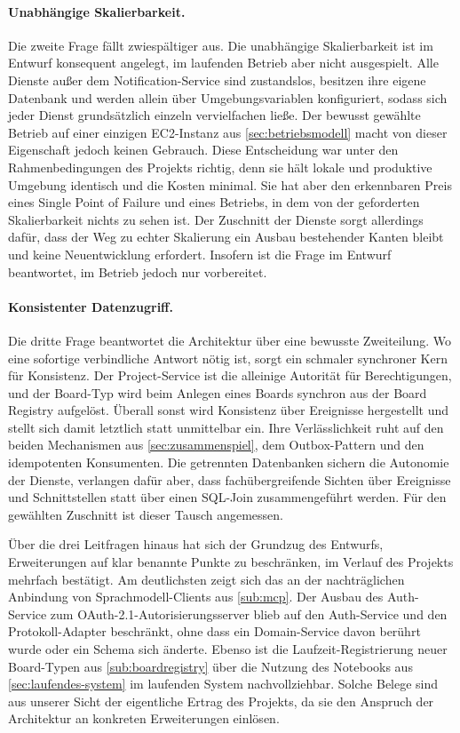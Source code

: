 \paragraph{Unabhängige Skalierbarkeit.} Die zweite Frage fällt zwiespältiger aus. Die unabhängige Skalierbarkeit ist im Entwurf konsequent angelegt, im laufenden Betrieb aber nicht ausgespielt. Alle Dienste außer dem Notification-Service sind zustandslos, besitzen ihre eigene Datenbank und werden allein über Umgebungsvariablen konfiguriert, sodass sich jeder Dienst grundsätzlich einzeln vervielfachen ließe. Der bewusst gewählte Betrieb auf einer einzigen EC2-Instanz aus \vref{sec:betriebsmodell} macht von dieser Eigenschaft jedoch keinen Gebrauch. Diese Entscheidung war unter den Rahmenbedingungen des Projekts richtig, denn sie hält lokale und produktive Umgebung identisch und die Kosten minimal. Sie hat aber den erkennbaren Preis eines Single Point of Failure und eines Betriebs, in dem von der geforderten Skalierbarkeit nichts zu sehen ist. Der Zuschnitt der Dienste sorgt allerdings dafür, dass der Weg zu echter Skalierung ein Ausbau bestehender Kanten bleibt und keine Neuentwicklung erfordert. Insofern ist die Frage im Entwurf beantwortet, im Betrieb jedoch nur vorbereitet.

\paragraph{Konsistenter Datenzugriff.} Die dritte Frage beantwortet die Architektur über eine bewusste Zweiteilung. Wo eine sofortige verbindliche Antwort nötig ist, sorgt ein schmaler synchroner Kern für Konsistenz. Der Project-Service ist die alleinige Autorität für Berechtigungen, und der Board-Typ wird beim Anlegen eines Boards synchron aus der Board Registry aufgelöst. Überall sonst wird Konsistenz über Ereignisse hergestellt und stellt sich damit letztlich statt unmittelbar ein. Ihre Verlässlichkeit ruht auf den beiden Mechanismen aus \vref{sec:zusammenspiel}, dem Outbox-Pattern und den idempotenten Konsumenten. Die getrennten Datenbanken sichern die Autonomie der Dienste, verlangen dafür aber, dass fachübergreifende Sichten über Ereignisse und Schnittstellen statt über einen SQL-Join zusammengeführt werden. Für den gewählten Zuschnitt ist dieser Tausch angemessen.

Über die drei Leitfragen hinaus hat sich der Grundzug des Entwurfs, Erweiterungen auf klar benannte Punkte zu beschränken, im Verlauf des Projekts mehrfach bestätigt. Am deutlichsten zeigt sich das an der nachträglichen Anbindung von Sprachmodell-Clients aus \vref{sub:mcp}. Der Ausbau des Auth-Service zum OAuth-2.1-Autorisierungsserver blieb auf den Auth-Service und den Protokoll-Adapter beschränkt, ohne dass ein Domain-Service davon berührt wurde oder ein Schema sich änderte. Ebenso ist die Laufzeit-Registrierung neuer Board-Typen aus \vref{sub:boardregistry} über die Nutzung des Notebooks aus \vref{sec:laufendes-system} im laufenden System nachvollziehbar. Solche Belege sind aus unserer Sicht der eigentliche Ertrag des Projekts, da sie den Anspruch der Architektur an konkreten Erweiterungen einlösen.

